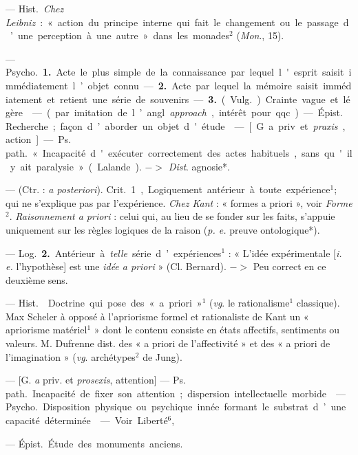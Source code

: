 \begin{itemize}[leftmargin=1cm, label=, itemsep=1pt]
{{{{ — \si{Hist.} {\it Chez Leibniz} :
« action du principe interne qui fait
le changement ou le passage d’une
perception à une autre » dans les
monades$^2$ ({\it Mon}., 15).

 — \si{Psycho.} {\bf 1.} Acte le
plus simple de la connaissance par
lequel l'esprit saisit immédiatement
l’objet connu. — {\bf 2.} Acte par lequel
la mémoire saisit immédiatement et
retient une série de souvenirs. —
 {\bf 3.} (\si{Vulg.}) Crainte vague et légère.

 — (par imitation de l’angl.
{\it approach}, intérêt pour qqc). —
\si{Épist.} Recherche; façon d’aborder
un objet d'étude.

 — [G. a priv. et {\it praxis}, action]
— \si{Ps. path.} « Incapacité d'exécuter
correctement des actes habituels,
sans qu'il y ait paralysie » (Lalande).
$->$ {\it Dist}. agnosie*.

 — (Ctr. : {\it a posteriori}). \si{Crit.}
1, Logiquement antérieur à toute
expérience$^1$; qui ne s'explique pas
par l'expérience. {\it Chez Kant} : « formes
a priori », voir {\it Forme}$^2$. {\it Raisonnement a priori} : celui qui, au lieu de
se fonder sur les faits, s’appuie uniquement sur les règles logiques de la
raison ({\it p. e.} preuve ontologique*).

— \si{Log.} {\bf 2.} Antérieur à {\it telle} série
d’expériences$^1$ : « L'idée expérimentale [{\it i. e.} l'hypothèse] est une {\it idée
a priori} » (Cl. Bernard). $->$ Peu
correct en ce deuxième sens.

 — \si{Hist.}  Doctrine qui
pose des « a priori »$^1$ ({\it vg}. le rationalisme$^1$ classique). Max Scheler à
opposé à l’apriorisme formel et rationaliste de Kant un « apriorisme
matériel$^1$ » dont le contenu consiste
en états affectifs, sentiments ou
valeurs. M. Dufrenne dist. des « a
priori de l’affectivité » et des « a
priori de l'imagination » ({\it vg}. archétypes$^2$ de Jung).

 — [G. {\it a} priv. et {\it prosexis}, attention] — \si{Ps. path.} Incapacité de
fixer son attention; dispersion intellectuelle morbide.

 — \si{Psycho.} Disposition physique ou psychique innée formant le
substrat d’une capacité déterminée.

 — Voir Liberté$^6$,

 — \si{Épist.} Étude des monuments anciens.

}}}}
\end{itemize}
